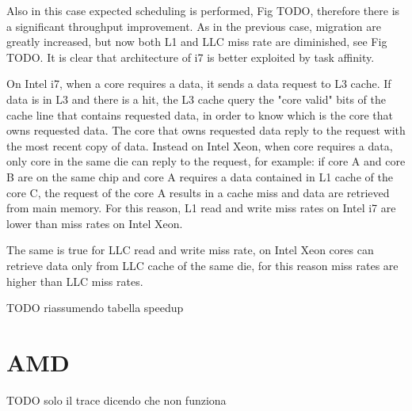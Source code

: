 Also in this case expected scheduling is performed, Fig TODO, therefore there is a significant throughput improvement. As in the previous case, migration 
are greatly increased, but now both L1 and LLC miss rate are diminished, see Fig TODO. It is clear that architecture of i7 is better exploited by task 
affinity.  

On Intel i7, when a core requires a data, it sends a data request to L3 cache. If data is in L3 and there is a hit, the L3 cache query the "core valid" 
bits of the cache line that contains requested data, in order to know which is the core that owns requested data. The core that owns requested data reply to 
the request with the most recent copy of data. Instead on Intel Xeon, when core requires a data, only core in the same die can reply to the request, for 
example: if core A and core B are on the same chip and core A requires a data contained in L1 cache of the core C, the request of the core A results in a 
cache miss and data are retrieved from main memory. For this reason, L1 read and write miss rates on Intel i7 are lower than miss rates on Intel Xeon.

The same is true for LLC read and write miss rate, on Intel Xeon cores can retrieve data only from LLC cache of the same die, for this reason miss rates 
are higher than LLC miss rates.

TODO riassumendo tabella speedup


\section{AMD}

TODO solo il trace dicendo che non funziona



